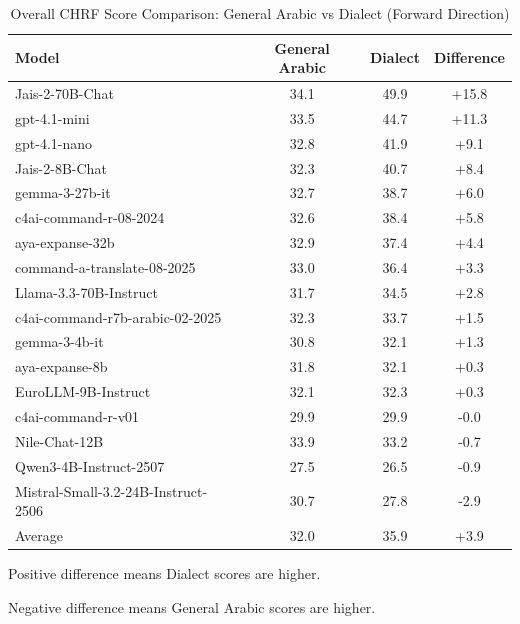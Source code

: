 \begin{table}[h]
\centering
\caption{Overall CHRF Score Comparison: General Arabic vs Dialect (Forward Direction)}
\label{tab:overall-general-dialect-difference}
\begin{tabular}{lccc}
\toprule
Model & General Arabic & Dialect & Difference \\
\midrule
Jais-2-70B-Chat & 34.1 & 49.9 & +15.8 \\
gpt-4.1-mini & 33.5 & 44.7 & +11.3 \\
gpt-4.1-nano & 32.8 & 41.9 & +9.1 \\
Jais-2-8B-Chat & 32.3 & 40.7 & +8.4 \\
gemma-3-27b-it & 32.7 & 38.7 & +6.0 \\
c4ai-command-r-08-2024 & 32.6 & 38.4 & +5.8 \\
aya-expanse-32b & 32.9 & 37.4 & +4.4 \\
command-a-translate-08-2025 & 33.0 & 36.4 & +3.3 \\
Llama-3.3-70B-Instruct & 31.7 & 34.5 & +2.8 \\
c4ai-command-r7b-arabic-02-2025 & 32.3 & 33.7 & +1.5 \\
gemma-3-4b-it & 30.8 & 32.1 & +1.3 \\
aya-expanse-8b & 31.8 & 32.1 & +0.3 \\
EuroLLM-9B-Instruct & 32.1 & 32.3 & +0.3 \\
c4ai-command-r-v01 & 29.9 & 29.9 & -0.0 \\
Nile-Chat-12B & 33.9 & 33.2 & -0.7 \\
Qwen3-4B-Instruct-2507 & 27.5 & 26.5 & -0.9 \\
Mistral-Small-3.2-24B-Instruct-2506 & 30.7 & 27.8 & -2.9 \\
\midrule
Average & 32.0 & 35.9 & +3.9 \\
\bottomrule
\end{tabular}
\begin{tablenotes}
\small
\item Positive difference means Dialect scores are higher.
\item Negative difference means General Arabic scores are higher.
\end{tablenotes}
\end{table}
